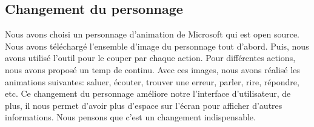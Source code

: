 \subsection{Changement du personnage}
\indent Nous avons choisi un personnage d'animation de Microsoft qui est open source. Nous avons téléchargé l'ensemble d'image du personnage tout d'abord. Puis, nous avons utilisé l'outil pour le couper par chaque action. Pour différentes actions, nous avons proposé un temp de continu. Avec ces images, nous avons réalisé les animations  suivantes: saluer, écouter, trouver une  erreur, parler, rire, répondre, etc. Ce changement du personnage améliore notre l'interface d'utilisateur, de plus, il nous permet d'avoir plus d'espace sur l'écran pour afficher d'autres informations. Nous pensons que c'est un changement indispensable.
